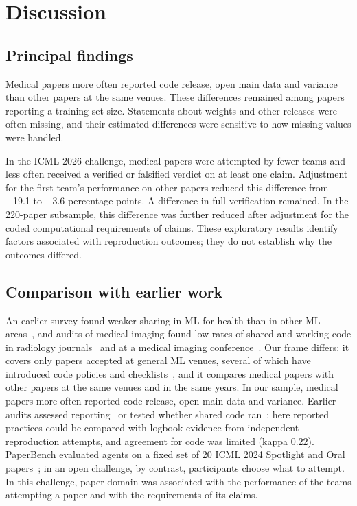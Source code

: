 \documentclass[11pt]{article}
\begin{document}
\section*{Discussion}
\subsection*{Principal findings}
Medical papers more often reported code release, open main data and variance than other papers at the same venues. These differences remained among papers reporting a training-set size. Statements about weights and other releases were often missing, and their estimated differences were sensitive to how missing values were handled.

In the ICML 2026 challenge, medical papers were attempted by fewer teams and less often received a verified or falsified verdict on at least one claim. Adjustment for the first team's performance on other papers reduced this difference from −19.1 to −3.6 percentage points. A difference in full verification remained. In the 220-paper subsample, this difference was further reduced after adjustment for the coded computational requirements of claims. These exploratory results identify factors associated with reproduction outcomes; they do not establish why the outcomes differed.

\subsection*{Comparison with earlier work}
An earlier survey found weaker sharing in ML for health than in other ML areas~\cite{r2}, and audits of medical imaging found low rates of shared and working code in radiology journals~\cite{r3} and at a medical imaging conference~\cite{r4}. Our frame differs: it covers only papers accepted at general ML venues, several of which have introduced code policies and checklists~\cite{r6}, and it compares medical papers with other papers at the same venues and in the same years. In our sample, medical papers more often reported code release, open main data and variance. Earlier audits assessed reporting~\cite{r5} or tested whether shared code ran~\cite{r3,r4}; here reported practices could be compared with logbook evidence from independent reproduction attempts, and agreement for code was limited (kappa 0.22). PaperBench evaluated agents on a fixed set of 20 ICML 2024 Spotlight and Oral papers~\cite{r8}; in an open challenge, by contrast, participants choose what to attempt. In this challenge, paper domain was associated with the performance of the teams attempting a paper and with the requirements of its claims.
\end{document}
